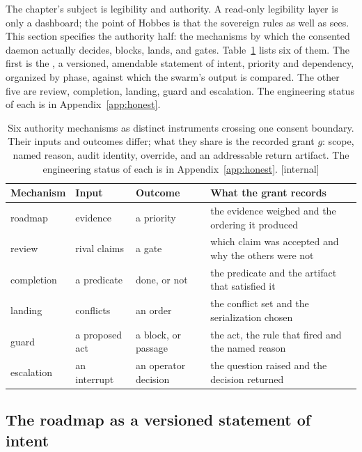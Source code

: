 \documentclass[11pt,a4paper]{article}
\theoremstyle{definition}
\theoremstyle{plain}
\begin{document}
The chapter's subject is legibility and authority. A read-only legibility layer is only a
dashboard; the point of Hobbes is that the sovereign rules as well as
sees. This section specifies the authority half: the
mechanisms by which the consented daemon actually decides, blocks, lands, and
gates. Table~\ref{tab:ls-authority-organs} lists six of them. The first is the
, a versioned, amendable statement of intent, priority and
dependency, organized by phase, against which the swarm's output is compared.
The other five are review, completion, landing, guard and escalation. The
engineering status of each is in Appendix~\ref{app:honest}.

\begin{table}[H]
\centering
\caption{Six authority mechanisms as distinct instruments crossing one consent boundary. Their inputs and outcomes differ; what they share is the recorded grant $g$: scope, named reason, audit identity, override, and an addressable return artifact. The engineering status of each is in Appendix~\ref{app:honest}. [internal]}
\label{tab:ls-authority-organs}
\small
\renewcommand{\arraystretch}{1.15}
\begin{tabularx}{\linewidth}{@{}l >{\raggedright\arraybackslash}X >{\raggedright\arraybackslash}X >{\raggedright\arraybackslash}X@{}}
\toprule
\textbf{Mechanism} & \textbf{Input} & \textbf{Outcome} & \textbf{What the grant records} \\
\midrule
roadmap & evidence & a priority & the evidence weighed and the ordering it produced \\
review & rival claims & a gate & which claim was accepted and why the others were not \\
completion & a predicate & done, or not & the predicate and the artifact that satisfied it \\
landing & conflicts & an order & the conflict set and the serialization chosen \\
guard & a proposed act & a block, or passage & the act, the rule that fired and the named reason \\
escalation & an interrupt & an operator decision & the question raised and the decision returned \\
\bottomrule
\end{tabularx}
\end{table}

\subsection{The roadmap as a versioned statement of intent}\label{sec:roadmap}
\end{document}
